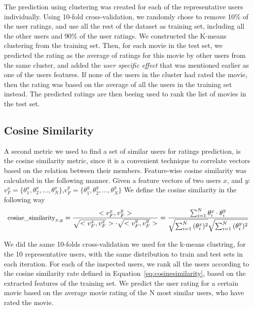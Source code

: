 The prediction using clustering was created for each of the representative users individually. Using 10-fold cross-validation, we randomly chose to remove 10\% of the user ratings, and use all the rest of the dataset as training set, including all the other users and 90\% of the user ratings. We constructed the K-means clustering from the training set. Then, for each movie in the test set, we predicted the rating as the average of ratings for this movie by other users from the same cluster, and added the \textit{user specific effect} that was mentioned earlier as one of the users features. If none of the users in the cluster had rated the movie, then the rating was based on the average of all the users in the training set instead. The predicted ratings are then beeing used to rank the list of movies in the test set.

\subsection{Cosine Similarity}

A second metric we used to find a set of similar users for ratings prediction, is the cosine similarity metric, since it is a convenient technique to correlate vectors based on the relation between their members.
Feature-wise cosine similarity was calculated in the following manner. Given a feature vectors of two users $x$, and $y$: $v^x_{F}=\{\theta^x_{1},\theta^x_{2},...,\theta^x_{N}\}$,$v^y_{F}=\{\theta^y_{1},\theta^y_{2},...,\theta^y_{N}\}$
We define the cosine similarity in the following way
\begin{equation}
\footnotesize
\text{cosine\_similarity}_{x,y} = \frac{<v^x_{F},v^y_{F}>}{\sqrt{<v^x_{F},v^x_{F}}> \cdot \sqrt{<v^y_{F},v^y_{F}}>}=\frac{\sum^N_{i=1}{\theta^x_i \cdot \theta^y_i}}{{\sqrt{\sum^N_{i=1}{(\theta^x_i)^2} }}\sqrt{\sum^N_{i=1}{(\theta^y_i)^2 }}}
\label{eq:cosinesimilarity}
\end{equation}

We did the same 10-folds cross-validation we used for the k-means clustring, for the 10 representative users, with the same distribution to train and test sets in each iteration. For each of the inspected users, we rank all the users according to the cosine similarity rate defined in Equation~\ref{eq:cosinesimilarity}, based on the extracted features of the training set.
We predict the user rating for a certain movie based on the average movie rating of the N most similar users, who have rated the movie.

